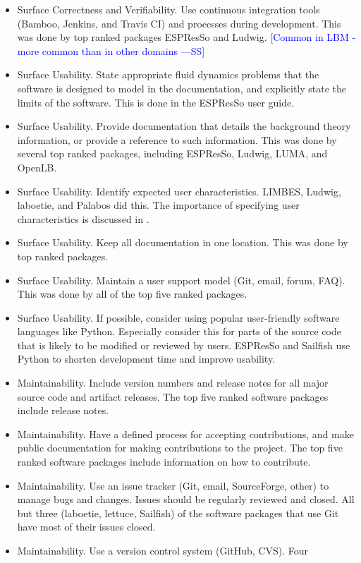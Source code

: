 \documentclass[final, 3p, times, authoryear]{elsarticle}
\newcommand{\authornote}[3]{\textcolor{#1}{[#3 ---#2]}}
\newcommand{\authornote}[3]{}
\newcommand{\wss}[1]{\authornote{blue}{SS}{#1}} %
\begin{document}
\begin{itemize}
{	this points seems repetitive}
	\item Surface Correctness and Verifiability. Use continuous integration
	tools (Bamboo, Jenkins, and Travis CI) and processes during development.
	This was done by top ranked packages ESPResSo and Ludwig.  \wss{Common in
	LBM - more common than in other domains}
	\item Surface Usability. State appropriate fluid dynamics problems that the
	software is designed to model in the documentation, and explicitly state the
	limits of the software. This is done in the ESPResSo user guide.
	\item Surface Usability. Provide documentation that details the background
	theory information, or provide a reference to such information. This was
	done by several top ranked packages, including ESPResSo, Ludwig, LUMA, and
	OpenLB.
	\item Surface Usability. Identify expected user characteristics. LIMBES,
	Ludwig, laboetie, and Palabos did this. The importance of specifying user
	characteristics is discussed in \citep{smith2007requirements}.
	\item Surface Usability. Keep all documentation in one location. This was
	done by top ranked packages.
	\item Surface Usability. Maintain a user support model (Git, email, forum,
	FAQ). This was done by all of the top five ranked packages.
	\item Surface Usability. If possible, consider using popular user-friendly
	software languages like Python. Especially consider this for parts of the
	source code that is likely to be modified or reviewed by users. ESPResSo and
	Sailfish use Python to shorten development time and improve usability.
	\item Maintainability. Include version numbers and release notes for all
	major source code and artifact releases. The top five ranked software
	packages include release notes.
	\item Maintainability. Have a defined process for accepting contributions,
	and make public documentation for making contributions to the project. The
	top five ranked software packages include information on how to contribute. 
	\item Maintainability. Use an issue tracker (Git, email, SourceForge, other)
	to manage bugs and changes. Issues should be regularly reviewed and closed.
	All but three (laboetie, lettuce, Sailfish) of the software packages that
	use Git have most of their issues closed.
	\item Maintainability. Use a version control system (GitHub, CVS). Four

\end{itemize}
\end{document}
